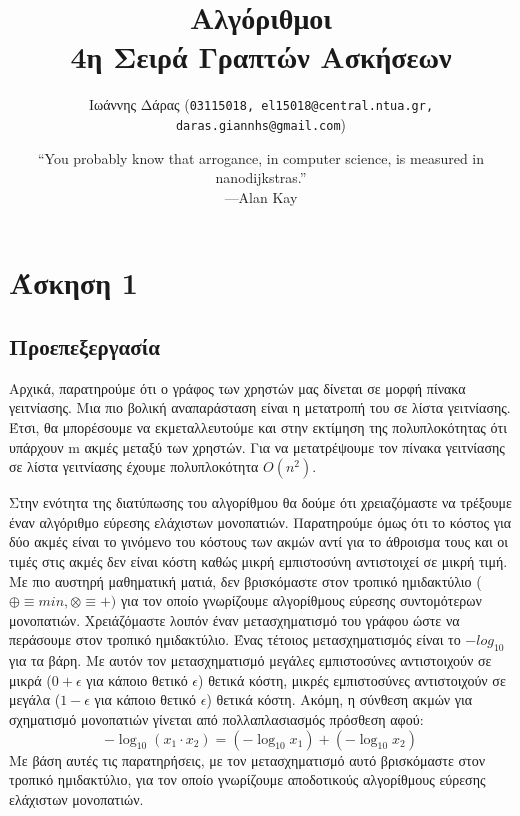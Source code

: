 \documentclass[a4paper,oneside, 11pt]{article}
\title{\textbf{Αλγόριθμοι \\ 4η Σειρά Γραπτών Ασκήσεων}}
\author{ Ιωάννης Δάρας (\texttt{03115018, el15018@central.ntua.gr, daras.giannhs@gmail.com})
}
\date{“You probably know that arrogance, in computer science, is measured in nanodijkstras.” \\ —Alan Kay}
\begin{document}
\maketitle
\noindent\makebox[\linewidth]{\rule{\paperwidth}{0.4pt}}



\section{Άσκηση 1}

\subsection{Προεπεξεργασία}
Αρχικά, παρατηρούμε ότι ο γράφος των χρηστών μας δίνεται σε μορφή πίνακα γειτνίασης. Μια πιο βολική αναπαράσταση είναι η μετατροπή του σε λίστα γειτνίασης. Έτσι, θα μπορέσουμε να εκμεταλλευτούμε και στην εκτίμηση της πολυπλοκότητας ότι υπάρχουν m ακμές μεταξύ των χρηστών. Για να μετατρέψουμε τον πίνακα γειτνίασης σε λίστα γειτνίασης έχουμε πολυπλοκότητα $O(n^2)$. \bigbreak 

Στην ενότητα της διατύπωσης του αλγορίθμου θα δούμε ότι χρειαζόμαστε να τρέξουμε έναν αλγόριθμο εύρεσης ελάχιστων μονοπατιών. Παρατηρούμε όμως ότι το κόστος για δύο ακμές είναι το γινόμενο του κόστους των ακμών αντί για το άθροισμα τους και οι τιμές στις ακμές δεν είναι κόστη καθώς μικρή εμπιστοσύνη αντιστοιχεί σε μικρή τιμή. Με πιο αυστηρή μαθηματική ματιά, δεν βρισκόμαστε στον τροπικό ημιδακτύλιο ($\oplus \equiv min, \otimes \equiv +)$ για τον οποίο γνωρίζουμε αλγορίθμους εύρεσης συντομότερων μονοπατιών. Χρειάζόμαστε λοιπόν έναν μετασχηματισμό του γράφου ώστε να περάσουμε στον τροπικό ημιδακτύλιο. Ένας τέτοιος μετασχηματισμός είναι το $-log_{10}$ για τα βάρη. Με αυτόν τον μετασχηματισμό μεγάλες εμπιστοσύνες αντιστοιχούν σε μικρά ($0+\epsilon$ για κάποιο θετικό $\epsilon$) θετικά κόστη, μικρές εμπιστοσύνες αντιστοιχούν σε μεγάλα ($1 - \epsilon$ για κάποιο θετικό $\epsilon$) θετικά κόστη. Ακόμη, η σύνθεση ακμών για σχηματισμό μονοπατιών γίνεται από πολλαπλασιασμός πρόσθεση αφού:
$$
-\log_{10}(x_1 \cdot x_2) = (-\log_{10}x_1) + (-\log_{10}x_2) 
$$
Με βάση αυτές τις παρατηρήσεις, με τον μετασχηματισμό αυτό βρισκόμαστε στον τροπικό ημιδακτύλιο, για τον οποίο γνωρίζουμε αποδοτικούς αλγορίθμους εύρεσης ελάχιστων μονοπατιών.
\end{document}
